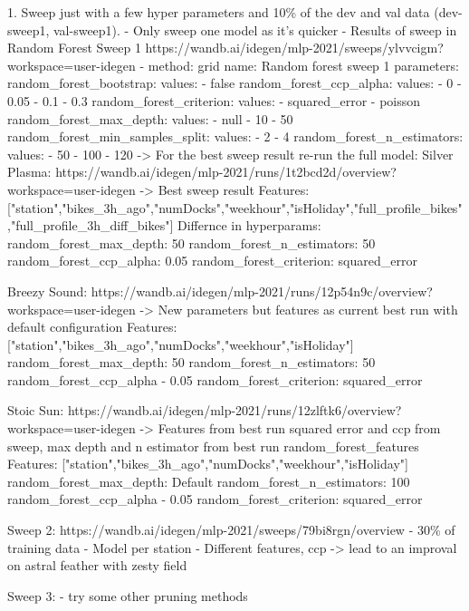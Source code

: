 \documentclass[a4paper]{article}
\begin{document}
    1. Sweep just with a few hyper parameters and 10\% of the dev and val data (dev-sweep1, val-sweep1).
    - Only sweep one model as it's quicker
    - Results of sweep in Random Forest Sweep 1 https://wandb.ai/idegen/mlp-2021/sweeps/ylvvcigm?workspace=user-idegen
    - method: grid
    name: Random forest sweep 1
    parameters:
    random\_forest\_bootstrap:
    values:
    - false
    random\_forest\_ccp\_alpha:
    values:
    - 0
    - 0.05
    - 0.1
    - 0.3
    random\_forest\_criterion:
    values:
    - squared\_error
    - poisson
    random\_forest\_max\_depth:
    values:
    - null
    - 10
    - 50
    random\_forest\_min\_samples\_split:
    values:
    - 2
    - 4
    random\_forest\_n\_estimators:
    values:
    - 50
    - 100
    - 120
    -> For the best sweep result re-run the full model:
    Silver Plasma: https://wandb.ai/idegen/mlp-2021/runs/1t2bcd2d/overview?workspace=user-idegen
    -> Best sweep result
    Features:
    ["station","bikes\_3h\_ago","numDocks","weekhour","isHoliday","full\_profile\_bikes","full\_profile\_3h\_diff\_bikes"]
    Differnce in hyperparams:
    random\_forest\_max\_depth: 50
    random\_forest\_n\_estimators: 50
    random\_forest\_ccp\_alpha: 0.05
    random\_forest\_criterion: squared\_error

    Breezy Sound: https://wandb.ai/idegen/mlp-2021/runs/12p54n9c/overview?workspace=user-idegen
    -> New parameters but features as current best run with default configuration
    Features: ["station","bikes\_3h\_ago","numDocks","weekhour","isHoliday"]
    random\_forest\_max\_depth: 50
    random\_forest\_n\_estimators: 50
    random\_forest\_ccp\_alpha - 0.05
    random\_forest\_criterion: squared\_error

    Stoic Sun: https://wandb.ai/idegen/mlp-2021/runs/12zlftk6/overview?workspace=user-idegen
    -> Features from best run squared error and ccp from sweep, max depth and n estimator from best run
    random\_forest\_features
    Features: ["station","bikes\_3h\_ago","numDocks","weekhour","isHoliday"]
    random\_forest\_max\_depth: Default
    random\_forest\_n\_estimators: 100
    random\_forest\_ccp\_alpha - 0.05
    random\_forest\_criterion: squared\_error

    Sweep 2: https://wandb.ai/idegen/mlp-2021/sweeps/79bi8rgn/overview
    - 30\% of training data
    - Model per station
    - Different features, ccp
    -> lead to an improval on astral feather with zesty field

    Sweep 3:
    - try some other pruning methods
\end{document}
